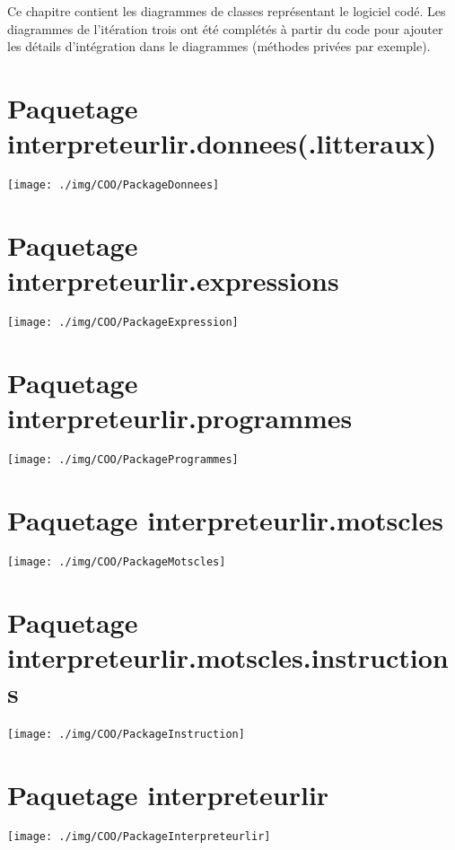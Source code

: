 \par Ce chapitre contient les diagrammes de classes représentant le logiciel codé. Les diagrammes de l'itération trois ont été complétés à partir du code pour ajouter les détails d'intégration dans le diagrammes (méthodes privées par exemple).

\section{Paquetage interpreteurlir.donnees(.litteraux)}
\begin{center}\texttt{[image: ./img/COO/PackageDonnees]}\end{center}

\section{Paquetage interpreteurlir.expressions}
\begin{center}\texttt{[image: ./img/COO/PackageExpression]}\end{center}

\section{Paquetage interpreteurlir.programmes}
\begin{center}\texttt{[image: ./img/COO/PackageProgrammes]}\end{center}

\section{Paquetage interpreteurlir.motscles}
\begin{center}\texttt{[image: ./img/COO/PackageMotscles]}\end{center}

\section{Paquetage interpreteurlir.motscles.instructions}
\begin{center}\texttt{[image: ./img/COO/PackageInstruction]}\end{center}

\section{Paquetage interpreteurlir}
\begin{center}\texttt{[image: ./img/COO/PackageInterpreteurlir]}\end{center}
